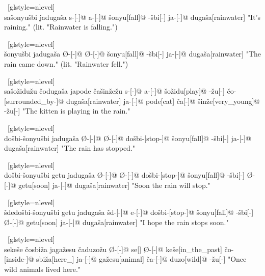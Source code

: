 \ex~[glstyle=nlevel]
\begingl
\glpreamble {} \\ sa\v{s}onyu\v{s}bi jaduga\v{s}a
\endpreamble
s-[{\Ind}-]@
a-[{\Prog}-]@
\v{s}onyu[fall]@
-\v{s}bi[-{\Inan}]
ja-[{\Nom}-]@
duga\v{s}a[rainwater]
\glft "It's raining." (lit. "Rainwater is falling.")
\endgl
\xe

\ex~[glstyle=nlevel]
\begingl
\glpreamble {} \\ \v{s}onyu\v{s}bi jaduga\v{s}a
\endpreamble
Ø-[{\Ind}-]@
Ø-[{\Pfv}-]@
\v{s}onyu[fall]@
-\v{s}bi[-{\Inan}]
ja-[{\Nom}-]@
duga\v{s}a[rainwater]
\glft "The rain came down." (lit. "Rainwater fell.")
\endgl
\xe

\ex~[glstyle=nlevel]
\begingl
\glpreamble {} \\ sa\v{s}o\v{z}idu\v{z}u \v{c}oduga\v{s}a japode \v{c}a\v{s}in\v{z}e\v{z}u
\endpreamble
s-[{\Ind}-]@
a-[{\Prog}-]@
\v{s}o\v{z}idu[play]@
-\v{z}u[-{\An}]
\v{c}o-[surrounded\_by-]@
duga\v{s}a[rainwater]
ja-[{\Nom}-]@
pode[cat]
\v{c}a[{\Nom}-]@
\v{s}in\v{z}e[very\_young]@
-\v{z}u[-{\An}]
\glft "The kitten is playing in the rain."
\endgl
\xe

\ex~[glstyle=nlevel]
\begingl
\glpreamble {} \\ do\v{s}bi-\v{s}onyu\v{s}bi jaduga\v{s}a
\endpreamble
Ø-[{\Ind}-]@
Ø-[{\Pfv}-]@
do\v{s}bi-[stop-]@
\v{s}onyu[fall]@
-\v{s}bi[-{\Inan}]
ja-[{\Nom}-]@
duga\v{s}a[rainwater]
\glft "The rain has stopped."
\endgl
\xe

\ex~[glstyle=nlevel]
\begingl
\glpreamble {} \\ do\v{s}bi-\v{s}onyu\v{s}bi getu jaduga\v{s}a
\endpreamble
Ø-[{\Ind}-]@
Ø-[{\Pfv}-]@
do\v{s}bi-[stop-]@
\v{s}onyu[fall]@
-\v{s}bi[-{\Inan}]
Ø-[{\Pfv}-]@
getu[soon]
ja-[{\Nom}-]@
duga\v{s}a[rainwater]
\glft "Soon the rain will stop."
\endgl
\xe

\ex~[glstyle=nlevel]
\begingl
\glpreamble {} \\ \v{s}dedo\v{s}bi-\v{s}onyu\v{s}bi getu jaduga\v{s}a
\endpreamble
\v{s}d-[{\Opt}-]@
e-[{\Pfv}-]@
do\v{s}bi-[stop-]@
\v{s}onyu[fall]@
-\v{s}bi[-{\Inan}]
Ø-[{\Pfv}-]@
getu[soon]
ja-[{\Nom}-]@
duga\v{s}a[rainwater]
\glft "I hope the rain stops soon."
\endgl
\xe

\ex~[glstyle=nlevel]
\begingl
\glpreamble {} \\ seke\v{s}e \v{c}osbi\v{z}a jaga\v{z}esu \v{c}aduzo\v{z}u
\endpreamble
Ø-[{\Ind}-]@
se[{\Cop}]
Ø-[{\Pfv}-]@
ke\v{s}e[in\_the\_past]
\v{c}o-[inside-]@
sbi\v{z}a[here\_]
ja-[{\Nom}-]@
ga\v{z}esu[animal]
\v{c}a-[{\Nom}-]@
duzo[wild]@
-\v{z}u[-{\An}]
\glft "Once wild animals lived here."
\endgl
\xe

